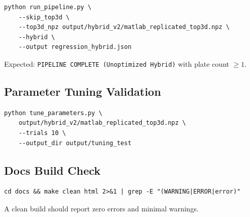 \documentclass[a4paper, 11pt, openany]{report}
\begin{document}
\begin{lstlisting}[style=bashstyle]
python run_pipeline.py \
    --skip_top3d \
    --top3d_npz output/hybrid_v2/matlab_replicated_top3d.npz \
    --hybrid \
    --output regression_hybrid.json
\end{lstlisting}

Expected: \texttt{PIPELINE COMPLETE (Unoptimized Hybrid)} with plate count $\ge 1$.

\subsection{Parameter Tuning Validation}

\begin{lstlisting}[style=bashstyle]
python tune_parameters.py \
    output/hybrid_v2/matlab_replicated_top3d.npz \
    --trials 10 \
    --output_dir output/tuning_test
\end{lstlisting}

\subsection{Docs Build Check}

\begin{lstlisting}[style=bashstyle]
cd docs && make clean html 2>&1 | grep -E "(WARNING|ERROR|error)"
\end{lstlisting}

A clean build should report zero errors and minimal warnings.
\end{document}
